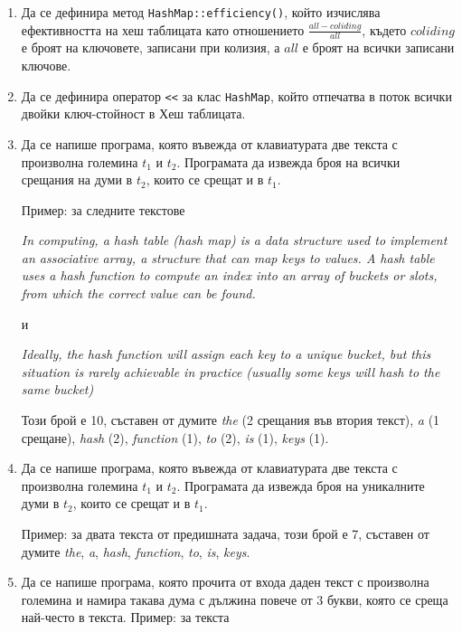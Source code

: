   \begin{enumerate}
  
    \item Да се дефинира метод \texttt{HashMap::efficiency()}, който изчислява ефективността на хеш таблицата като отношението  $\frac{all-coliding}{all}$, където $coliding$ е броят на ключовете, записани при колизия, а $all$ е броят на всички записани ключове.
  
  
    \item Да се дефинира оператор \texttt{<}\texttt{<} за клас \texttt{HashMap}, който отпечатва в поток всички двойки ключ-стойност в Хеш таблицата.
  
    \item Да се напише програма, която въвежда от клавиатурата две текста с произволна големина $t_1$ и $t_2$. Програмата да извежда броя на всички срещания на думи в $t_2$, които се срещат и в $t_1$.
  
    Пример: за следните текстове
  
    \textit{In computing, a hash table (hash map) is a data structure used to implement an associative array, a structure that can map keys to values. A hash table uses a hash function to compute an index into an array of buckets or slots, from which the correct value can be found.}
  
    и
  
    \textit{Ideally, the hash function will assign each key to a unique bucket, but this situation is rarely achievable in practice (usually some keys will hash to the same bucket)}
  
    Този брой е 10, съставен от думите \textit {the} (2 срещания във втория текст), \textit{a} (1 срещане), \textit{hash} (2), \textit {function} (1), \textit{to} (2), \textit{is} (1), \textit{keys} (1).
  
  
    \item Да се напише програма, която въвежда от клавиатурата две текста с произволна големина $t_1$ и $t_2$. Програмата да извежда броя на уникалните думи в $t_2$, които се срещат и в $t_1$.
  
    Пример: за двата текста от предишната задача, този брой е 7, съставен от думите \textit {the}, \textit{a}, \textit{hash}, \textit {function}, \textit{to}, \textit{is}, \textit{keys}.
  
  
    \item Да се напише програма, която прочита от входа даден текст с произволна големина и намира такава дума с дължина повече от 3 букви, която се среща най-често в текста. Пример: за текста
  

\end{enumerate}
